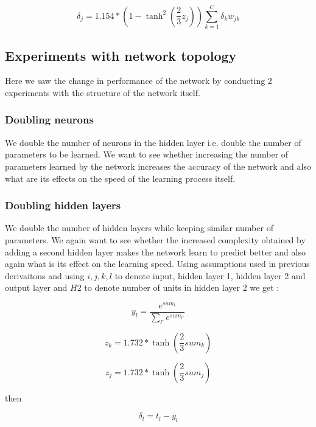 \documentclass[11pt,twoside]{article}
\begin{document}
\begin{equation}
\delta_{j} = 1.154*(1 - \tanh^{2}(\frac{2}{3}z_{j})) \sum_{k = 1}^{C} \delta_{k} w_{jk}
\end{equation}

\subsection{Experiments with network topology}
Here we saw the change in performance of the network by conducting 2 experiments with the structure of the network itself.


\subsubsection{Doubling neurons}
We double the number of neurons in the hidden layer i.e. double the number of parameters to be learned. We want to see whether increasing the number of parameters learned by the network increases the accuracy of the network and also what are its effects on the speed of the learning process itself.

\subsubsection{Doubling hidden layers}
We double the number of hidden layers while keeping similar number of parameters. We again want to see whether the increased complexity obtained by adding a second hidden layer makes the network learn to predict better and also again what is its effect on the learning speed. Using assumptions used in previous derivaitons and using $i, j, k, l$ to denote input, hidden layer 1, hidden layer 2 and output layer and $H2$ to denote number of units in hidden layer 2 we get : 

\begin{equation}
y_{l} = \frac{e^{sum_{l}}}{\sum_{l'}e^{sum_{l'}}}
\end{equation}

\begin{equation}
z_{k} = 1.732*\tanh(\frac{2}{3}sum_{k})
\end{equation}

\begin{equation}
z_{j} = 1.732*\tanh(\frac{2}{3}sum_{j})
\end{equation}

 then
 
\begin{equation}
\delta_{l} = t_{l} - y_{l}
\end{equation}
\end{document}
